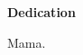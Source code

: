 \begin{doublespace}
  \begin{center}
    \textbf{Dedication}
  \end{center}
  Mama.
\end{doublespace}